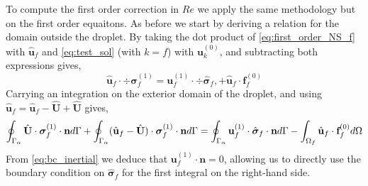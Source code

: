 To compute the first order correction in $Re$ we apply the same methodology but on the first order equaitons. 
As before we start by deriving a relation for the domain outside the droplet.
By taking the dot product of \ref{eq:first_order_NS_f} with $\hat{\textbf{u}}_f$ and \ref{eq:test_sol} (with $k = f$) with $\textbf{u}_k^{(0)}$, and subtracting both expressions gives, 
\begin{equation*}
    \hat{\textbf{u}}_f\cdot \div\bm\sigma_f^{(1)}
    =
    \textbf{u}_f^{(1)} \cdot \div \hat{\bm\sigma}_f, 
    + \hat{\textbf{u}}_f\cdot  \textbf{f}^{(0)}_f
\end{equation*}
Carrying an integration on the exterior domain of the droplet, and using $\hat{\textbf{u}}_f =\hat{\textbf{u}}_f  - \hat{\textbf{U}} + \hat{\textbf{U}}$ gives, 
\begin{equation}
    \intS{\hat{\textbf{U}}\cdot  \bm\sigma_f^{(1)} \cdot \textbf{n}}
    + \intS{(\hat{\textbf{u}}_f - \hat{\textbf{U}})\cdot  \bm\sigma_f^{(1)} \cdot \textbf{n}}
    = 
    \intS{\textbf{u}_f^{(1)}\cdot  \hat{\bm\sigma}_f \cdot \textbf{n}}
    - \intOf{\hat{\textbf{u}}_f\cdot  \textbf{f}^{(0)}_f}
    \label{eq:stepone}
\end{equation}
From \ref{eq:bc_inertial} we deduce that $\textbf{u}_f^{(1)} \cdot \textbf{n} = 0$, allowing us to directly use the boundary condition on $\hat{\bm\sigma}_f$ for the first integral on the right-hand side. 

